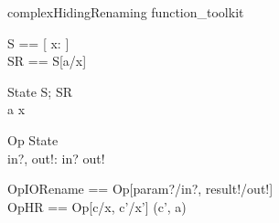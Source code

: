 \documentclass{article}
\begin{document}
\begin{zsection}
\SECTION complexHidingRenaming \parents function\_toolkit
\end{zsection}

\begin{zed}
   S == [ x: \nat ] \\
   SR == S[a/x] %
\end{zed}

\begin{schema}{State}
   S; SR \\
\where
   a \neq x %
\end{schema}

\begin{schema}{Op}
   \Delta State\\
   in?, out!: \nat
\where
   in? \neq out!
\end{schema}

\begin{zed}
   OpIORename == Op[param?/in?, result!/out!] \\
   OpHR	      == Op[c/x, c'/x'] \hide (c', a)
\end{zed}
\end{document}

